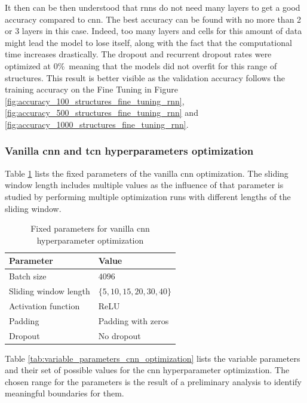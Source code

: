 \documentclass[conference]{IEEEtran}
\begin{document}
It then can be then understood that \glspl{rnn} do not need many layers to get a good accuracy compared to \gls{cnn}. The best accuracy can be found with no more than 2 or 3 layers in this case. Indeed, too many layers and cells for this amount of data might lead the model to lose itself, along with the fact that the computational time increases drastically. The dropout and recurrent dropout rates were optimized at 0\%\ meaning that the models did not overfit for this range of structures. This result is better visible as the validation accuracy follows the training accuracy on the Fine Tuning in Figure \ref{fig:accuracy_100_structures_fine_tuning_rnn}, \ref{fig:accuracy_500_structures_fine_tuning_rnn} and \ref{fig:accuracy_1000_structures_fine_tuning_rnn}.

\subsubsection{Vanilla \gls{cnn} and \gls{tcn} hyperparameters optimization}

Table \ref{tab:fixed_parameters_cnn_optimization} lists the fixed parameters of the vanilla \gls{cnn} optimization. The sliding window length includes multiple values as the influence of that parameter is studied by performing multiple optimization runs with different lengths of the sliding window.

\begin{table}[htp]
	\centering
	\caption{Fixed parameters for vanilla \gls{cnn} hyperparameter optimization}
	\label{tab:fixed_parameters_cnn_optimization}
	\begin{tabular}{ll}
		\textbf{Parameter} & \textbf{Value} \\
		\hline
		Batch size & $ 4096 $ \\
		Sliding window length & $ \{5, 10, 15, 20, 30, 40\} $ \\
		Activation function & ReLU \\
		Padding & Padding with zeros \\
		Dropout & No dropout
	\end{tabular}
\end{table}

Table \ref{tab:variable_parameters_cnn_optimization} lists the variable parameters and their set of possible values for the \gls{cnn} hyperparameter optimization. The chosen range for the parameters is the result of a preliminary analysis to identify meaningful boundaries for them.
\end{document}
